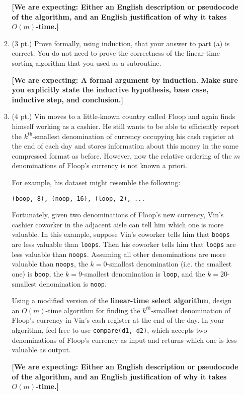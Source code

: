 \documentclass{article}
\begin{document}
\begin{enumerate}
\begin{enumerate}
        \textbf{[We are expecting: Either an English description or pseudocode of
        the algorithm, and an English justification of why it takes $O(m)$-time.]}
      \item (3 pt.) Prove formally, using induction, that your answer to part (a) is
        correct. You do not need to prove the correctness of the linear-time sorting
        algorithm that you used as a subroutine.

        \textbf{[We are expecting: A formal argument by induction. Make sure you
        explicitly state the inductive hypothesis, base case, inductive step, and
        conclusion.]}
      \item (4 pt.) Vin moves to a little-known country called Floop and again finds
        himself working as a cashier. He still wants to be able to efficiently
        report the $k^{\textrm{th}}$-smallest denomination of currency occupying his
        cash register at the end of each day and stores information about this money
        in the same compressed format as before. However, now the relative ordering
        of the $m$ denominations of Floop's currency is not known a priori.

        For example, his dataset might resemble the following:

        \begin{center}
          \texttt{(boop, 8), (noop, 16), (loop, 2), ...}
        \end{center}

        Fortunately, given two denominations of Floop's new currency, Vin's cashier
        coworker in the adjacent aisle can tell him which one is more valuable. In
        this example, suppose Vin's coworker tells him that \texttt{boops} are less
        valuable than \texttt{loops}. Then his coworker tells him that 
        \texttt{loops} are less valuable than \texttt{noops}. Assuming all other
        denominations are more valuable than \texttt{noops}, the
        $k=0$-smallest denomination (i.e. the smallest one) is \texttt{boop}, the
        $k=9$-smallest denomination is \texttt{loop}, and the $k=20$-smallest
        denomination is \texttt{noop}.

        Using a modified version of the \textbf{linear-time select algorithm},
        design an $O(m)$-time algorithm for finding the $k^{th}$-smallest
        denomination of Floop's currency in Vin's cash register at the end of the
        day. In your algorithm, feel free to use \texttt{compare(d1, d2)}, which
        accepts two denominations of Floop's currency as input and returns which one
        is less valuable as output.

        \textbf{[We are expecting: Either an English description or pseudocode of
        the algorithm, and an English justification of why it takes $O(m)$-time.]}
    \end{enumerate}
\end{enumerate}
\end{document}
